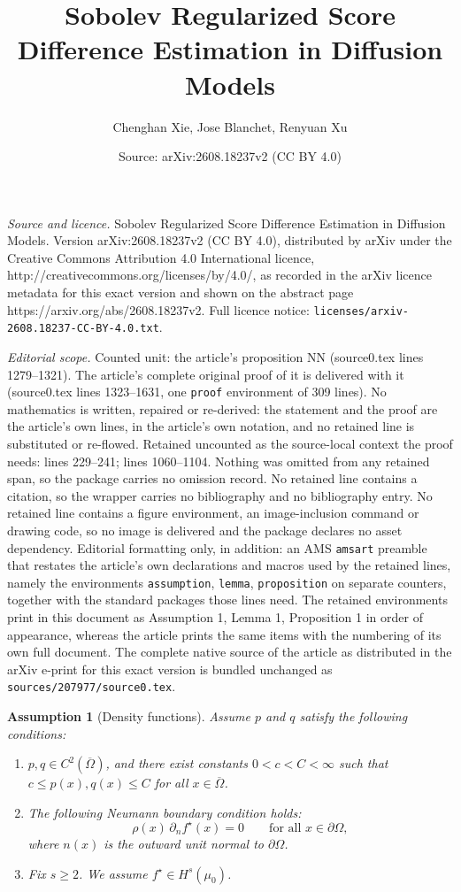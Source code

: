 \documentclass[10pt,a4paper]{amsart}
\title{Sobolev Regularized Score Difference Estimation in Diffusion Models}
\author{Chenghan Xie, Jose Blanchet, Renyuan Xu}
\date{Source: arXiv:2608.18237v2 (CC BY 4.0)}
\newtheorem{assumption}{Assumption}
\begin{document}
\maketitle

\noindent\emph{Source and licence.} Sobolev Regularized Score Difference Estimation in Diffusion Models. Version arXiv:2608.18237v2 (CC BY 4.0), distributed by arXiv under the Creative Commons Attribution 4.0 International licence, http://creativecommons.org/licenses/by/4.0/, as recorded in the arXiv licence metadata for this exact version and shown on the abstract page https://arxiv.org/abs/2608.18237v2. Full licence notice: \texttt{licenses/arxiv-2608.18237-CC-BY-4.0.txt}.\par\smallskip

\noindent\textit{Editorial scope.} Counted unit: the article's proposition NN (source0.tex lines 1279--1321). The article's complete original proof of it is delivered with it (source0.tex lines 1323--1631, one \texttt{proof} environment of 309 lines). No mathematics is written, repaired or re-derived: the statement and the proof are the article's own lines, in the article's own notation, and no retained line is substituted or re-flowed.  Retained uncounted as the source-local context the proof needs: lines 229--241; lines 1060--1104.  Nothing was omitted from any retained span, so the package carries no omission record.  No retained line contains a citation, so the wrapper carries no bibliography and no bibliography entry.  No retained line contains a figure environment, an image-inclusion command or drawing code, so no image is delivered and the package declares no asset dependency.  Editorial formatting only, in addition: an AMS \texttt{amsart} preamble that restates the article's own declarations and macros used by the retained lines, namely the environments \texttt{assumption}, \texttt{lemma}, \texttt{proposition} on separate counters, together with the standard packages those lines need.  The retained environments print in this document as Assumption 1, Lemma 1, Proposition 1 in order of appearance, whereas the article prints the same items with the numbering of its own full document.  The complete native source of the article as distributed in the arXiv e-print for this exact version is bundled unchanged as \texttt{sources/207977/source0.tex}.
\begin{assumption}[Density functions]\label{assm: density}
Assume  $p$ and $q$ satisfy the following conditions:
\begin{enumerate}
\item $p,q\in C^2(\overline\Omega)$, and there exist constants \(0<c<C<\infty\) such that \(c\le p(x),q(x)\le C\) for all \(x\in\overline\Omega\).
\item The following Neumann boundary condition holds:
\[
\rho(x)\,\partial_n f^\star(x)=0
\qquad \text{for all }x\in\partial\Omega,
\]
where \(n(x)\) is the outward unit normal to \(\partial\Omega\).
\item Fix $s\geq2$. We assume $f^\star \in H^s(\mu_0)$.
\end{enumerate}
\end{assumption}
\end{document}
